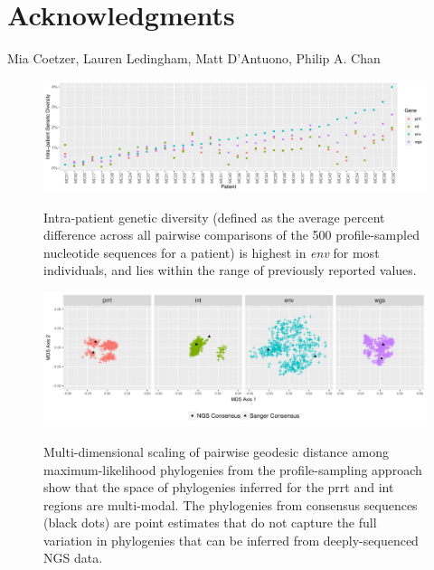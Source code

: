 \documentclass[letterpaper]{article}
\begin{document}
\section*{Acknowledgments}

Mia Coetzer, Lauren Ledingham, Matt D'Antuono, Philip A. Chan

\printbibliography

\begin{figure}[p!]
	\caption{Intra-patient genetic diversity (defined as the average percent difference across all pairwise comparisons of the 500 profile-sampled nucleotide sequences for a patient) is highest in \emph{env} for most individuals, and lies within the range of previously reported values.}
	\centering
	\includegraphics[width=\linewidth]{Figure1}
	\label{fig1}
\end{figure}

\begin{figure}[p!]
	\caption{Multi-dimensional scaling of pairwise geodesic distance among maximum-likelihood phylogenies from the profile-sampling approach show that the space of phylogenies inferred for the prrt and int regions are multi-modal. The phylogenies from consensus sequences (black dots) are point estimates that do not capture the full variation in phylogenies that can be inferred from deeply-sequenced NGS data.}
	\centering
	\includegraphics[width=\linewidth]{Figure2}
	\label{fig2}
\end{figure}
	
\end{document}
